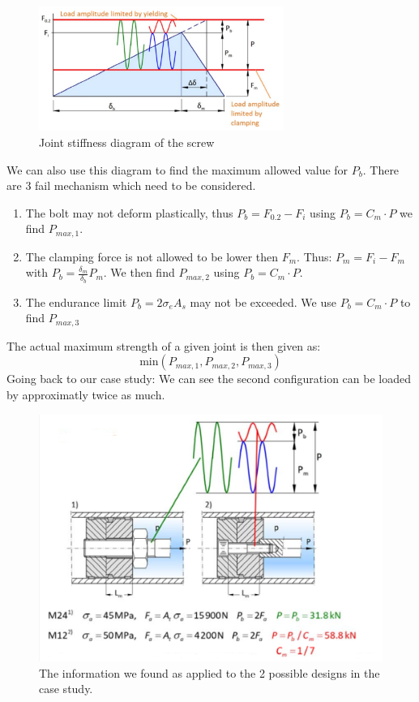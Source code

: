 \documentclass[11pt, a4paper]{article}
\begin{document}
\begin{figure}[h]
  \centerline{\includegraphics[width=80mm]{images/JSD.png}}
  \caption{Joint stiffness diagram of the screw}
\end{figure}
We can also use this diagram to find the maximum allowed value for $P_b$. There are $3$ fail mechanism which need to be considered.
\begin{enumerate}
  \item The bolt may not deform plastically, thus $P_b = F_{0.2} - F_i$ using $P_b = C_m\cdot P$ we find $P_{max,1}$.
  \item The clamping force is not allowed to be lower then $F_m$. Thus: $P_m = F_i - F_m$ with $P_b = \frac{\delta_m}{\delta_b}P_m$. We then find $P_{max,2}$ using $P_b = C_m\cdot P$.
  \item The endurance limit $P_b = 2\sigma_eA_s$ may not be exceeded. We use $P_b = C_m\cdot P$ to find $P_{max,3}$
\end{enumerate}
The actual maximum strength of a given joint is then given as:
\begin{equation}
  \text{min}(P_{max,1},P_{max,2},P_{max,3})
\end{equation}
Going back to our case study: We can see the second configuration can be loaded by approximatly twice as much.
\begin{figure}[H]
  \centerline{\includegraphics[width=120mm]{images/Bolts_3.png}}
  \caption{The information we found as applied to the 2 possible designs in the case study.}
\end{figure}
\end{document}
